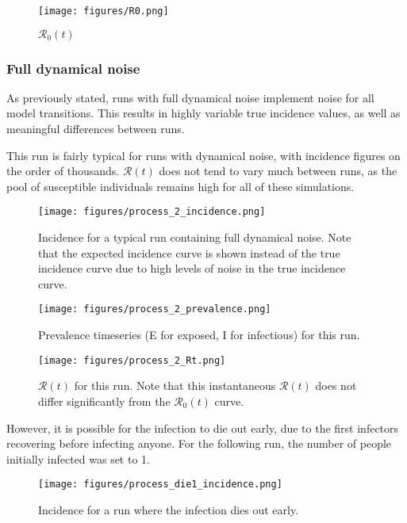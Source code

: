 \documentclass{article}
\newcommand{\nR}{\mathscr{R}}
\begin{document}
\begin{figure}[h!]
    \centering
    \texttt{[image: figures/R0.png]}
    \caption{$\nR_0(t)$}
    \label{fig:my_label}
\end{figure}

\subsubsection{Full dynamical noise}
As previously stated, runs with full dynamical noise implement noise for all model transitions. This results in highly variable true incidence values, as well as meaningful differences between runs.

This run is fairly typical for runs with dynamical noise, with incidence figures on the order of thousands. $\nR(t)$ does not tend to vary much between runs, as the pool of susceptible individuals remains high for all of these simulations.

\begin{figure}[h!]
    \centering
    \texttt{[image: figures/process\_2\_incidence.png]}
    \caption{Incidence for a typical run containing full dynamical noise. Note that the expected incidence curve is shown instead of the true incidence curve due to high levels of noise in the true incidence curve.}
\end{figure}

\clearpage
\begin{figure}[h!]
\centering
\texttt{[image: figures/process\_2\_prevalence.png]}
\caption{Prevalence timeseries (E for exposed, I for infectious) for this run.}
\end{figure}

\begin{figure}[h!]
\centering
\texttt{[image: figures/process\_2\_Rt.png]}
\caption{$\nR(t)$ for this run. Note that this instantaneous $\nR(t)$ does not differ significantly from the $\nR_0(t)$ curve.}
\end{figure}

However, it is possible for the infection to die out early, due to the first infectors recovering before infecting anyone. For the following run, the number of people initially infected was set to 1.

\begin{figure}[h!]
\centering
\texttt{[image: figures/process\_die1\_incidence.png]}
\caption{Incidence for a run where the infection dies out early.}
\end{figure}
\end{document}
